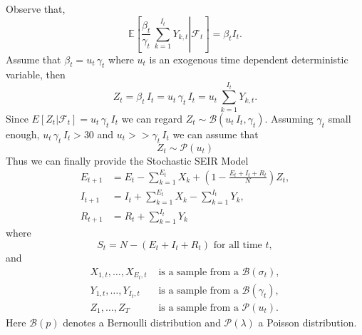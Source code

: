 \documentclass[12pt]{article}\usepackage[]{graphicx}\usepackage[]{color}
\begin{document}
Observe that,
$$
\mathbb{E}\left[\left. \frac{\beta_t}{\gamma_t} \, \sum_{k=1}^{I_t} Y_{k,t}  \right| \mathcal{F}_t \right] 
=  \beta_t I_t.
$$
Assume that $\beta_t = u_t \,  \gamma_t$ where $u_t$ is an exogenous time dependent deterministic variable, then
$$
Z_t = \beta_t \, I_t = u_t \, \gamma_t\, I_t  = u_t \, \sum_{k=1}^{I_t} Y_{k,t}.
$$
Since $E[Z_t|\mathcal{F}_t] = u_t \, \gamma_t\, I_t$ we can regard $Z_t \sim \mathcal{B}(u_t \,I_t,\gamma_t).$ Assuming $\gamma_t$ small enough, $ u_t \,\gamma_t\, I_t > 30$ and $u_t >> \gamma_t \, I_t$ we can assume that
$$
Z_t \sim \mathcal{P}(u_t)
$$
Thus we can finally provide the Stochastic SEIR Model
\begin{align}
E_{t+1} & = E_t - \sum_{k=1}^{E_t} X_{k} + \left( 1- \frac{E_t+I_t+R_t}{N} \right)Z_t, \\
I_{t+1} & = I_t + \sum_{k=1}^{E_t} X_{k}  - \sum_{k=1}^{I_t} Y_{k}, \\
R_{t+1} & = R_t + \sum_{k=1}^{I_t} Y_{k}
\end{align}
where 
$$
S_{t} = N-(E_t+I_t+R_t) \text{ for all time }t,
$$
and
\begin{align*}
X_{1,t},\ldots,X_{E_t,t} & \text{ is a sample from a } \mathcal{B}(\sigma_t), \\
Y_{1,t},\ldots,Y_{I_t,t} & \text{ is a sample from a } \mathcal{B}(\gamma_t), \\
Z_1,\ldots,Z_T & \text{ is a sample from a } \mathcal{P}(u_t).
\end{align*}
Here $\mathcal{B}(p)$ denotes a Bernoulli distribution and $\mathcal{P}(\lambda)$ a Poisson distribution.
\end{document}
